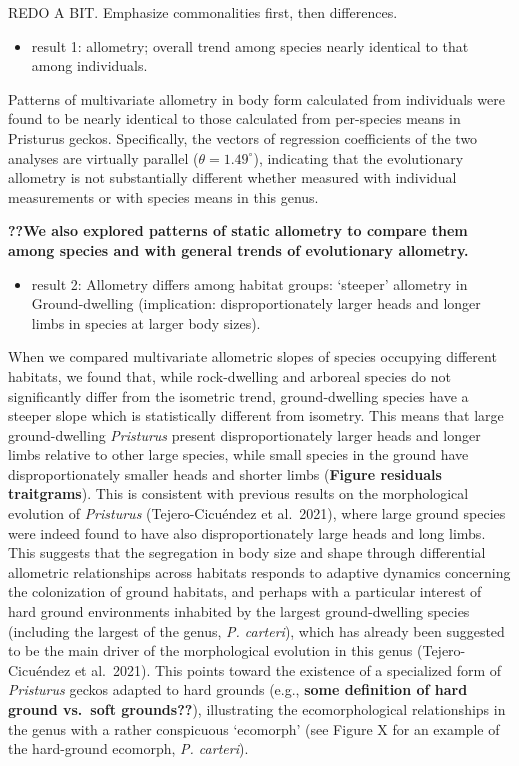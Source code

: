 \documentclass[
  11pt,
]{article}
\providecommand{\tightlist}{%
  \setlength{\itemsep}{0pt}\setlength{\parskip}{0pt}}
\begin{document}
REDO A BIT. Emphasize commonalities first, then differences.

\begin{itemize}
\tightlist
\item
  result 1: allometry; overall trend among species nearly identical to
  that among individuals.
\end{itemize}

Patterns of multivariate allometry in body form calculated from
individuals were found to be nearly identical to those calculated from
per-species means in Pristurus geckos. Specifically, the vectors of
regression coefficients of the two analyses are virtually parallel
(\(\theta = 1.49^\circ\)), indicating that the evolutionary allometry is
not substantially different whether measured with individual
measurements or with species means in this genus.

\textbf{??We also explored patterns of static allometry to compare them
among species and with general trends of evolutionary allometry.}

\begin{itemize}
\tightlist
\item
  result 2: Allometry differs among habitat groups: `steeper' allometry
  in Ground-dwelling (implication: disproportionately larger heads and
  longer limbs in species at larger body sizes).
\end{itemize}

When we compared multivariate allometric slopes of species occupying
different habitats, we found that, while rock-dwelling and arboreal
species do not significantly differ from the isometric trend,
ground-dwelling species have a steeper slope which is statistically
different from isometry. This means that large ground-dwelling
\emph{Pristurus} present disproportionately larger heads and longer
limbs relative to other large species, while small species in the ground
have disproportionately smaller heads and shorter limbs (\textbf{Figure
residuals traitgrams}). This is consistent with previous results on the
morphological evolution of \emph{Pristurus} (Tejero-Cicuéndez et
al.~2021), where large ground species were indeed found to have also
disproportionately large heads and long limbs. This suggests that the
segregation in body size and shape through differential allometric
relationships across habitats responds to adaptive dynamics concerning
the colonization of ground habitats, and perhaps with a particular
interest of hard ground environments inhabited by the largest
ground-dwelling species (including the largest of the genus, \emph{P.
carteri}), which has already been suggested to be the main driver of the
morphological evolution in this genus (Tejero-Cicuéndez et al.~2021).
This points toward the existence of a specialized form of
\emph{Pristurus} geckos adapted to hard grounds (e.g., \textbf{some
definition of hard ground vs.~soft grounds??}), illustrating the
ecomorphological relationships in the genus with a rather conspicuous
`ecomorph' (see Figure X for an example of the hard-ground ecomorph,
\emph{P. carteri}).
\end{document}
